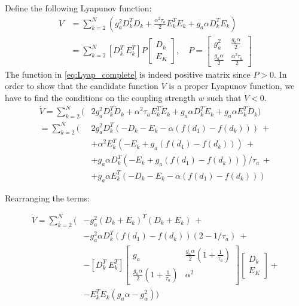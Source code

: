 Define the following Lyapunov function:
\begin{equation} 
\begin{aligned}
V &= \sum\limits_{k=2}^N( g_a^2 D_k^TD_k + 
    \frac{\alpha^2\tau_a}{2} E_k^TE_k + g_a\alpha D_k^TE_k) \\
  &= \sum\limits_{k=2}^N 
  [D_k^T\ E_k^T]
  P \begin{bmatrix}D_k \\ E_K \end{bmatrix}, \quad P = \begin{bmatrix} 
  g_a^2  & \frac{g_a\alpha}{2} \\ 
  \frac{g_a\alpha}{2} & \frac{\alpha^2\tau_a}{2}  
   \end{bmatrix} 
\end{aligned}
\label{eq:Lyap_complete}
\end{equation}
The function in \cref{eq:Lyap_complete} is indeed positive matrix since $P>0$. In order to show that the candidate function $V$ is a proper Lyapunov function,  we have to find the conditions on the coupling strength $w$ such that $\dot V<0$.
\begin{equation} 
\begin{aligned}
\dot V = \sum\limits_{k=2}^N( &2g_a^2 D_k^T\dot D_k + 
                             \alpha^2 \tau_a E_k^T \dot E_k + 
                             g_a\alpha D_k^T\dot E_k +
                             g_a\alpha E_k^T\dot D_k) \\ 
       = \sum\limits_{k=2}^N(&2g_a^2 D_k^T(- D_k - E_k - \alpha (f(d_1) - f(d_k)))\ +  \\
       & + \alpha^2 E_k^T(-E_k + g_a(f(d_1) - f(d_k)))\ + \\
       & + g_a\alpha D_k^T(-E_k + g_a(f(d_1) - f(d_k)))/\tau_a\ + \\
       & + g_a\alpha E_k^T(- D_k - E_k - \alpha (f(d_1) - f(d_k)))
\end{aligned}
\label{eq:Lyap_complete_derivative}
\end{equation}

Rearranging the terms:

\begin{equation} 
\begin{aligned}
\dot V = \sum\limits_{k=2}^N(&-g_a^2(D_k+E_k)^T(D_k+E_k)\ + \\ 
& - g_a^2\alpha D_k^T(f(d_1) - f(d_k))(2-1/\tau_a)\ + \\
& - [D_k^T\ E_k^T] \begin{bmatrix}g_a & \frac{g_a\alpha}{2}(1+\frac{1}{\tau_a}) \\ \frac{g_a\alpha}{2}(1+\frac{1}{\tau_a})  & \alpha^2 \end{bmatrix} \begin{bmatrix}D_k \\ E_K \end{bmatrix} + \\
& - E_k^TE_k(g_a\alpha-g_\alpha^2))
\end{aligned}
\label{eq:Lyap_complete_derivative_rarranged}
\end{equation}

